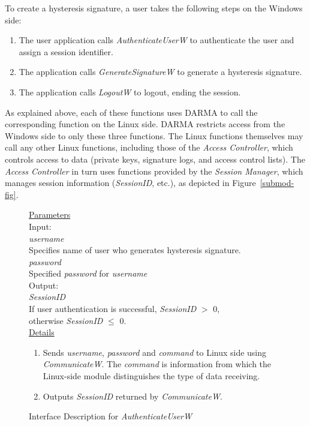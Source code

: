 \documentclass[a4paper,pdftex]{article}
\newcommand{\AuthenticateUserW}{\emph{AuthenticateUserW}}
\newcommand{\GenerateSignatureW}{\emph{GenerateSignatureW}}
\newcommand{\LogoutW}{\emph{LogoutW}}
\newcommand{\CommunicateW}{\emph{CommunicateW}}
\newcommand{\AccessController}{\emph{Access Controller}}
\newcommand{\SessionManager}{\emph{Session Manager}}
\newcommand{\SessionID}{\emph{SessionID}}
\newcommand{\username}{\emph{username}}
\newcommand{\password}{\emph{password}}
\newcommand{\command}{\emph{command}}
\newcommand{\oneindent}{\hspace*{10pt}}
\newcommand{\twoindent}{\hspace*{20pt}}
\newcommand{\threeindent}{\hspace*{30pt}}
\begin{document}
To create a hysteresis signature, a user takes the following steps on
the Windows side:
\begin{enumerate} \itemsep=2pt
\item The user application calls \AuthenticateUserW{} to authenticate the user and
assign a session identifier.
\item The application calls \GenerateSignatureW{} to generate a
hysteresis signature.
\item The application calls \LogoutW{} to logout, ending the session.
\end{enumerate}
As explained above, each of these functions uses DARMA to call the
corresponding function on the Linux side.  DARMA restricts
access from the Windows side to only these three functions.  The Linux
functions themselves may call any other Linux functions, including those
of the
\AccessController{}, which controls access to
data (private keys, signature logs, and access control lists).
The \AccessController{} in turn uses 
functions provided by the \SessionManager{}, which manages session information
(\SessionID, etc.), as depicted in Figure~\ref{submod-fig}.

\begin{figure}[t]
\begin{small}
\underline{Parameters}\\
\oneindent Input:\\
\twoindent \username\\
\threeindent Specifies name of user who generates hysteresis signature.\\
\twoindent \password \\
\threeindent Specified \password{} for \username\\
\oneindent Output:\\
\twoindent \SessionID\\
\threeindent If user authentication is successful, \SessionID{} $>$ 0,  \\
\threeindent otherwise \SessionID{} $\leq$ 0. \\[10pt]
\underline{Details} 
\begin{enumerate} \itemsep=2pt
\item Sends \username, \password{} and \command{} to Linux side using \CommunicateW. The \command{} is information from which the Linux-side module distinguishes the type of data receiving.
\item Outputs \SessionID{} returned by \CommunicateW{}. 
\end{enumerate}
\end{small}
\caption{Interface Description for \AuthenticateUserW \label{authWinterface}}
\end{figure}
\end{document}
